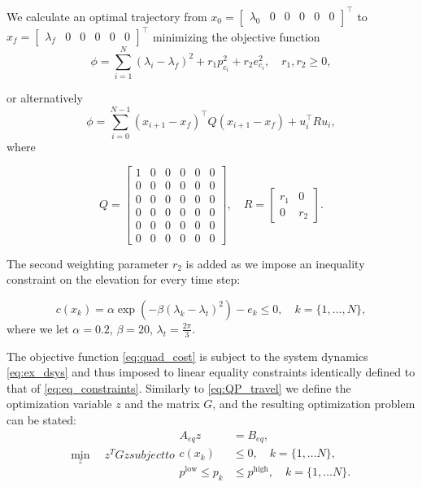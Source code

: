 We calculate an optimal trajectory from $x_0 = \begin{bmatrix}\lambda_0&0&0&0&0&0\end{bmatrix}^\top$ to $x_f = \begin{bmatrix}\lambda_f&0&0&0&0&0\end{bmatrix}^\top$ minimizing the objective function 
\begin{equation*}
	\phi = \sum_{i=1}^{N}(\lambda_i - \lambda_f)^2 + r_1 p^2_{c_i} + r_2 e^2_{c_i}, \quad r_1,r_2 \ge 0,
\end{equation*}

or alternatively
\begin{equation}
	\label{eq:quad_cost}
	\phi = \sum_{i=0}^{N-1} (x_{i+1}-x_f)^\top Q(x_{i+1}-x_f) + u_i^\top R u_i,
\end{equation}
where

\begin{equation}
Q = \begin{bmatrix}1&0&0&0&0&0\\0&0&0&0&0&0\\0&0&0&0&0&0\\0&0&0&0&0&0\\0&0&0&0&0&0\\0&0&0&0&0&0\end{bmatrix}, \quad R = \begin{bmatrix}r_1&0\\0&r_2\end{bmatrix}.
\end{equation}

 The second weighting parameter $r_2$ is added as we impose an inequality constraint on the elevation for every time step:

\begin{equation}
	\label{eq:cons}
	c(x_k) = \alpha \exp{\left(-\beta\left(\lambda_k - \lambda_t\right)^2\right)} - e_k \le 0, \quad k = \{1, \dots , N\},
\end{equation}
where we let $\alpha = 0.2$, $\beta = 20$, $\lambda_t = \frac{2\pi}{3}$.

The objective function \eqref{eq:quad_cost} is subject to the system dynamics \eqref{eq:ex_dsys} and thus imposed to linear equality constraints identically defined to that of \eqref{eq:eq_constraints}. Similarly to \eqref{eq:QP_travel} we define the optimization variable $z$ and the matrix $G$, and the resulting optimization problem can be stated:
\begin{subequations}
\label{eq:NOP}
	\begin{equation}
		\min_z \quad z^T G z
	\end{equation}
subject to
\begin{align}
	A_{eq} z &= B_{eq}, \\
	c(x_k) &\le 0, \quad k = \{1, \dots N\},\\
	p^{\textrm{low}} \le p_k &\le p^{\textrm{high}}, \quad k = \{1, \dots N\}.
\end{align}
\end{subequations}



